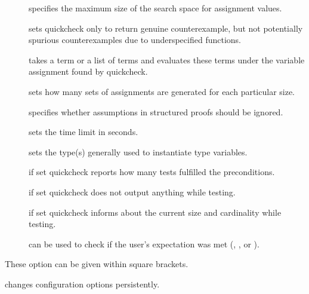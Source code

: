 \begin{isabellebody}
\begin{isamarkuptext}
\begin{description}
\begin{description}
    \item[] specifies the maximum size of the search space
    for assignment values.

    \item[] sets quickcheck only to return genuine
    counterexample, but not potentially spurious counterexamples due
    to underspecified functions.
    
    \item[] takes a term or a list of terms and evaluates
    these terms under the variable assignment found by quickcheck.

    \item[] sets how many sets of assignments are
    generated for each particular size.

    \item[] specifies whether assumptions in
    structured proofs should be ignored.

    \item[] sets the time limit in seconds.

    \item[] sets the type(s) generally used to
    instantiate type variables.

    \item[] if set quickcheck reports how many tests
    fulfilled the preconditions.

    \item[] if set quickcheck does not output anything
    while testing.
    
    \item[] if set quickcheck informs about the current
    size and cardinality while testing.

    \item[] can be used to check if the user's
    expectation was met (, , or ).

    \end{description}

  These option can be given within square brackets.

  \item \hyperlink{command.HOL.quickcheck-params}{\mbox{}} changes \hyperlink{command.HOL.quickcheck}{\mbox{}} configuration options persistently.


\end{description}
\end{isamarkuptext}
\end{isabellebody}
